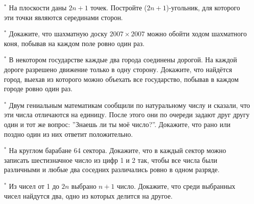 \begin{thm} $^*$
    На плоскости даны $2n + 1$ точек. Постройте ($2n + 1$)-угольник, для которого эти точки являются серединами сторон.
\end{thm}

\begin{thm} $^*$
    Докажите, что шахматную доску $2007 \times 2007$ можно обойти ходом шахматного коня, побывав на каждом поле ровно один раз.
\end{thm}

\begin{thm} $^*$
    В некотором государстве каждые два города соединены дорогой. На каждой дороге разрешено движение только в одну сторону. Докажите, что найдётся город, выехав из которого можно объехать все государство, побывав в каждом городе ровно один раз.
\end{thm}

\begin{thm} $^*$
    Двум гениальным математикам сообщили по натуральному числу и сказали, что эти числа отличаются на единицу. После этого они по очереди задают друг другу один и тот же вопрос: ''Знаешь ли ты моё число?''. Докажите, что рано или поздно один из них ответит положительно.
\end{thm}

\begin{thm} $^*$
    На круглом барабане 64 сектора. Докажите, что в каждый сектор можно записать шестизначное число из цифр 1 и 2 так, чтобы все числа были различными и любые два соседних различались ровно в одном разряде.
\end{thm}

\begin{thm} $^*$
    Из чисел от 1 до $2n$ выбрано $n + 1$ число. Докажите, что среди выбранных чисел найдутся два, одно из которых делится на другое.
\end{thm}
